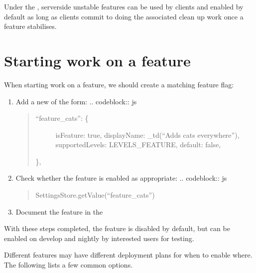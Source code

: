 \documentclass[letterpaper,10pt,openany,oneside,english]{sphinxmanual}
\begin{document}
\sphinxAtStartPar
Under the , server\sphinxhyphen{}side
unstable features can be used by clients and enabled by default as long as
clients commit to doing the associated clean up work once a feature stabilises.


\chapter{Starting work on a feature}
\label{\detokenize{feature-flags:starting-work-on-a-feature}}
\sphinxAtStartPar
When starting work on a feature, we should create a matching feature flag:
\begin{enumerate}
%
\item {} 
\sphinxAtStartPar
Add a new
of the form:
.. code\sphinxhyphen{}block:: js
\begin{quote}
\begin{description}
\item[{“feature\_cats”: \{}] \leavevmode
\sphinxAtStartPar
isFeature: true,
displayName: \_td(“Adds cats everywhere”),
supportedLevels: LEVELS\_FEATURE,
default: false,

\end{description}

\sphinxAtStartPar
\},
\end{quote}

\item {} 
\sphinxAtStartPar
Check whether the feature is enabled as appropriate:
.. code\sphinxhyphen{}block:: js
\begin{quote}

\sphinxAtStartPar
SettingsStore.getValue(“feature\_cats”)
\end{quote}

\item {} 
\sphinxAtStartPar
Document the feature in the 

\end{enumerate}

\sphinxAtStartPar
With these steps completed, the feature is disabled by default, but can be
enabled on develop and nightly by interested users for testing.

\sphinxAtStartPar
Different features may have different deployment plans for when to enable where.
The following lists a few common options.
\end{document}
